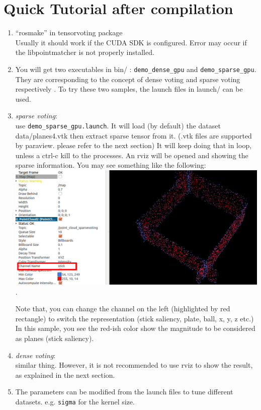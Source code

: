 \documentclass[a4paper, 11pt]{article}
\begin{document}
\section{Quick Tutorial after compilation}
\begin{enumerate}
\item ``rosmake'' in tensorvoting package\\
Usually it should work if the CUDA SDK is configured. Error may occur if the libpointmatcher is not properly installed.
\item You will get two executables in bin/ : {\tt demo\_dense\_gpu} and {\tt demo\_sparse\_gpu}.
They are corresponding to the concept of dense voting and sparse voting respectively \cite{mordohai2006tensor,schuster2004segmentation}.
To try these two samples, the launch files in launch/ can be used.
\item \textit{sparse voting}:\\
    use {\tt demo\_sparse\_gpu.launch}. It will load (by default) the dataset data/planes4.vtk then extract sparse tensor from it.
    (.vtk files are supported by paraview. please refer to the next section)
It will keep doing that in loop, unless a ctrl-c kill to the processes.
An rviz will be opened and showing the sparse information. You may see something like the following:\\
\includegraphics[width=\textwidth]{sparse}.

Note that, you can change the channel on the left (highlighted by red rectangle) to switch the representation (stick saliency, plate, ball, x, y, z etc.) 
In this sample, you see the red-ish color show the magnitude to be considered as planes (stick saliency).

\item \textit{dense voting}:\\
similar thing. However, it is not recommended to use rviz to show the result, as explained in the next section.

\item The parameters can be modified from the launch files to tune different datasets. e.g. {\tt sigma} for the kernel size.

\end{enumerate}
\end{document}
